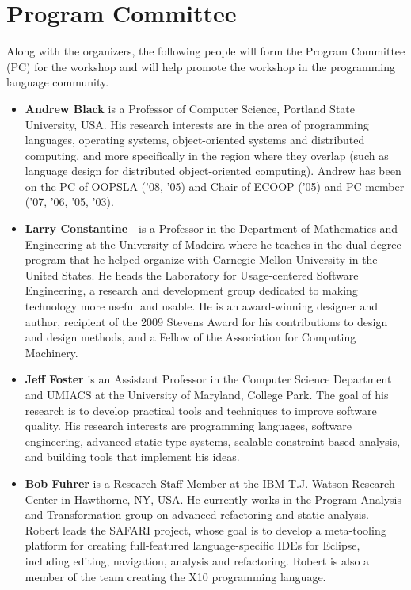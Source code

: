 \documentclass{acm_proc_article-sp}
\begin{document}
\section{Program Committee}

Along with the organizers, the following people will form the Program Committee (PC) for
the workshop and will help promote the workshop in the programming
language community.

\begin{itemize}

\item \textbf{Andrew Black} is a Professor of Computer Science, Portland State University, USA. His research interests are in the area of programming languages, operating systems, object-oriented systems and distributed computing, and more specifically in the region where they overlap (such as language design for distributed object-oriented computing). Andrew has been on the PC of OOPSLA ('08, '05) and Chair of ECOOP ('05) and PC member ('07, '06, '05, '03).

\item \textbf{Larry Constantine} - is a Professor in the Department of Mathematics and
Engineering at the University of Madeira where he teaches in the dual-degree
program that he helped organize with Carnegie-Mellon University in the
United States. He heads the Laboratory for Usage-centered Software
Engineering, a research and development group dedicated to making technology
more useful and usable. He is an award-winning designer and author,
recipient of the 2009 Stevens Award for his contributions to design and
design methods, and a Fellow of the Association for Computing Machinery.

\item \textbf{Jeff Foster} is an Assistant Professor in the Computer Science Department and UMIACS at the University of Maryland, College Park. The goal of his research is to develop practical tools and techniques to improve software quality. His research interests are programming languages, software engineering, advanced static type systems, scalable constraint-based analysis, and building tools that implement his ideas.

\item \textbf{Bob Fuhrer} is a Research Staff Member at the IBM T.J. Watson Research Center in Hawthorne, NY, USA. He currently works in the Program Analysis and Transformation group on advanced refactoring and static analysis. Robert leads the SAFARI project, whose goal is to develop a meta-tooling platform for creating full-featured language-specific IDEs for Eclipse, including editing, navigation, analysis and refactoring. Robert is also a member of the team creating the X10 programming language.


\end{itemize}
\end{document}
